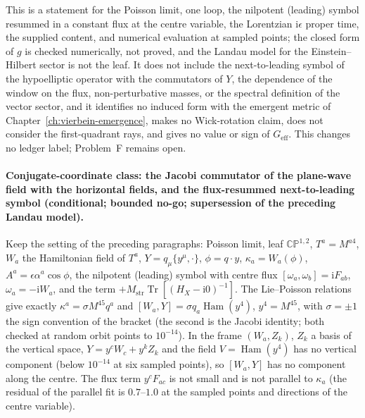 This is a statement for the Poisson limit, one loop, the nilpotent (leading) symbol resummed in a constant flux at the centre variable, the Lorentzian \(\mathrm i\epsilon\) proper time, the supplied content, and numerical evaluation at sampled points; the closed form of \(g\) is checked numerically, not proved, and the Landau model for the Einstein--Hilbert sector is not the leaf. It does not include the next-to-leading symbol of the hypoelliptic operator with the commutators of \(Y\), the dependence of the window on the flux, non-perturbative masses, or the spectral definition of the vector sector, and it identifies no induced form with the emergent metric of Chapter~\ref{ch:vierbein-emergence}, makes no Wick-rotation claim, does not consider the first-quadrant rays, and gives no value or sign of \(G_{\mathrm{eff}}\). This changes no ledger label; Problem~F remains open.

\paragraph{Conjugate-coordinate class: the Jacobi commutator of the plane-wave field with the horizontal fields, and the flux-resummed next-to-leading symbol (conditional; bounded no-go; supersession of the preceding Landau model).}
Keep the setting of the preceding paragraphs: Poisson limit, leaf \(\mathbb{CP}^{1,2}\), \(T^a=M^{a4}\), \(W_a\) the Hamiltonian field of \(T^a\), \(Y=q_\mu\{y^\mu,\cdot\}\), \(\phi=q\cdot y\), \(\kappa_a=W_a(\phi)\), \(A^a=\epsilon\alpha^a\cos\phi\), the nilpotent (leading) symbol with centre flux \([\omega_a,\omega_b]=\mathrm iF_{ab}\), \(\omega_a=-\mathrm iW_a\), and the term \(+M_{\mathrm{str}}\operatorname{Tr}[(H_X-\mathrm i0)^{-1}]\). The Lie--Poisson relations give exactly \(\kappa^a=\sigma M^{45}q^a\) and \([W_a,Y]=\sigma q_a\operatorname{Ham}(y^4)\), \(y^4=M^{45}\), with \(\sigma=\pm1\) the sign convention of the bracket (the second is the Jacobi identity; both checked at random orbit points to \(10^{-14}\)). In the frame \((W_a,Z_k)\), \(Z_k\) a basis of the vertical space, \(Y=y^cW_c+y^kZ_k\) and the field \(V=\operatorname{Ham}(y^4)\) has no vertical component (below \(10^{-14}\) at six sampled points), so \([W_a,Y]\) has no component along the centre. The flux term \(y^cF_{ac}\) is not small and is not parallel to \(\kappa_a\) (the residual of the parallel fit is \(0.7\)--\(1.0\) at the sampled points and directions of the centre variable).

